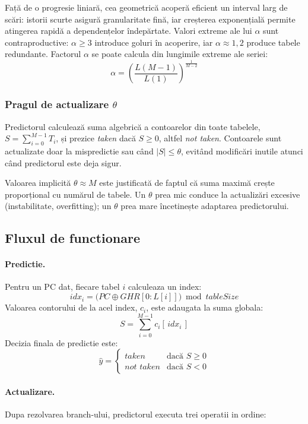 Față de o progresie liniară, cea geometrică acoperă eficient un interval larg de scări:
istorii scurte asigură granularitate fină, iar creșterea exponențială permite atingerea
rapidă a dependențelor îndepărtate. Valori extreme ale lui $\alpha$ sunt contraproductive:
$\alpha\geq3$ introduce goluri în acoperire, iar $\alpha\approx1{,}2$ produce tabele
redundante. Factorul $\alpha$ se poate calcula din lungimile extreme ale seriei:
\[
  \alpha = \left(\frac{L(M-1)}{L(1)}\right)^{\!\frac{1}{M-2}}
\]

\subsubsection*{Pragul de actualizare $\theta$}

Predictorul calculează suma algebrică a contoarelor din toate tabelele,
$S = \sum_{i=0}^{M-1} T_i$,
și prezice \textit{taken} dacă $S \geq 0$, altfel \textit{not taken}.
Contoarele sunt actualizate doar la mispredictie sau când $|S| \leq \theta$,
evitând modificări inutile atunci când predictorul este deja sigur.

Valoarea implicită $\theta \approx M$ este justificată de faptul că suma maximă crește
proporțional cu numărul de tabele. Un $\theta$ prea mic conduce la actualizări excesive
(instabilitate, overfitting); un $\theta$ prea mare încetinește adaptarea predictorului.

\subsection{Fluxul de functionare}

\paragraph{Predictie.}
Pentru un PC dat, fiecare tabel $i$ calculeaza un index:
\[
  \mathit{idx}_i = \bigl(PC \oplus \mathit{GHR}[0:L[i]]\bigr) \bmod \mathit{tableSize}
\]
Valoarea contorului de la acel index, $c_i$, este adaugata la suma globala:
\[
  S = \sum_{i=0}^{M-1} c_i[\,\mathit{idx}_i\,]
\]
Decizia finala de predictie este:
\[
  \hat{y} =
  \begin{cases}
    \textit{taken}     & \text{dacă } S \geq 0 \\
    \textit{not taken} & \text{dacă } S < 0
  \end{cases}
\]

\paragraph{Actualizare.}
Dupa rezolvarea branch-ului, predictorul executa trei operatii in ordine:

